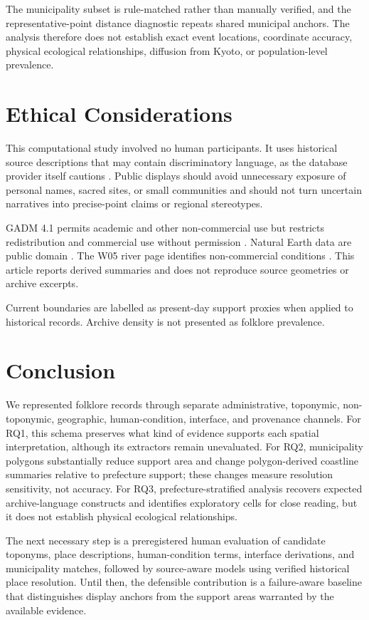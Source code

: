 \documentclass[9pt,twocolumn,a4paper]{extarticle}
\begin{document}
The municipality subset is rule-matched rather than manually verified, and the representative-point distance diagnostic repeats shared municipal anchors. The analysis therefore does not establish exact event locations, coordinate accuracy, physical ecological relationships, diffusion from Kyoto, or population-level prevalence.

\section{Ethical Considerations}

This computational study involved no human participants. It uses historical source descriptions that may contain discriminatory language, as the database provider itself cautions \citep{nichibun2025}. Public displays should avoid unnecessary exposure of personal names, sacred sites, or small communities and should not turn uncertain narratives into precise-point claims or regional stereotypes.

GADM 4.1 permits academic and other non-commercial use but restricts redistribution and commercial use without permission \citep{gadm41}. Natural Earth data are public domain \citep{naturalearth}. The W05 river page identifies non-commercial conditions \citep{mlitw05}. This article reports derived summaries and does not reproduce source geometries or archive excerpts.

Current boundaries are labelled as present-day support proxies when applied to historical records. Archive density is not presented as folklore prevalence.


\section{Conclusion}

We represented \ArchiveRecords{} folklore records through separate administrative, toponymic, non-toponymic, geographic, human-condition, interface, and provenance channels. For RQ1, this schema preserves what kind of evidence supports each spatial interpretation, although its extractors remain unevaluated. For RQ2, municipality polygons substantially reduce support area and change polygon-derived coastline summaries relative to prefecture support; these changes measure resolution sensitivity, not accuracy. For RQ3, prefecture-stratified analysis recovers expected archive-language constructs and identifies exploratory cells for close reading, but it does not establish physical ecological relationships.

The next necessary step is a preregistered human evaluation of candidate toponyms, place descriptions, human-condition terms, interface derivations, and municipality matches, followed by source-aware models using verified historical place resolution. Until then, the defensible contribution is a failure-aware baseline that distinguishes display anchors from the support areas warranted by the available evidence.



\begingroup
\fontsize{8}{9}\selectfont


\endgroup
\end{document}
